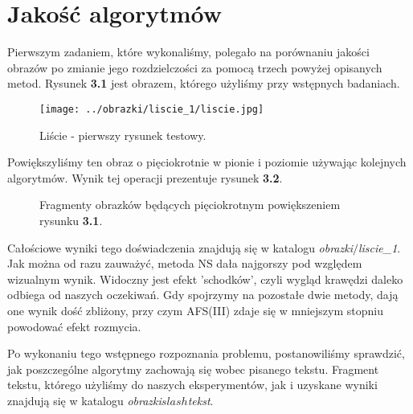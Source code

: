 \section{Jakość algorytmów}
Pierwszym zadaniem, które wykonaliśmy, polegało na porównaniu jakości obrazów po
zmianie jego rozdzielczości za pomocą trzech powyżej opisanych metod. Rysunek
\textbf{3.1} jest obrazem, którego użyliśmy przy wstępnych badaniach.
\begin{figure}[h!tb]
\begin{center}
\texttt{[image: ../obrazki/liscie\_1/liscie.jpg]}
\caption{Liście - pierwszy rysunek testowy.}
\end{center}
\end{figure}

Powiększyliśmy ten obraz o pięciokrotnie w pionie i poziomie używając
kolejnych algorytmów. Wynik tej operacji prezentuje rysunek \textbf{3.2}.
\begin{figure}[h!tb]
\begin{center}
\caption{Fragmenty obrazków będących pięciokrotnym powiększeniem rysunku \textbf{3.1}.}
\end{center}
\end{figure}

Całościowe wyniki tego doświadczenia znajdują się w katalogu \textit{obrazki$\slash$liscie\_1}. 
Jak można od razu zauważyć, metoda NS dała najgorszy pod względem wizualnym wynik.
Widoczny jest efekt 'schodków', czyli wygląd krawędzi daleko odbiega od naszych
oczekiwań. Gdy spojrzymy na pozostałe dwie metody, dają one wynik dość zbliżony,
przy czym AFS(III) zdaje się w mniejszym stopniu powodować efekt rozmycia.

Po wykonaniu tego wstępnego rozpoznania problemu, postanowiliśmy sprawdzić, jak
poszczególne algorytmy zachowają się wobec pisanego tekstu.
Fragment tekstu, którego użyliśmy do naszych eksperymentów, jak i uzyskane wyniki znajdują się w katalogu \textit{obrazki$slash$tekst}.

